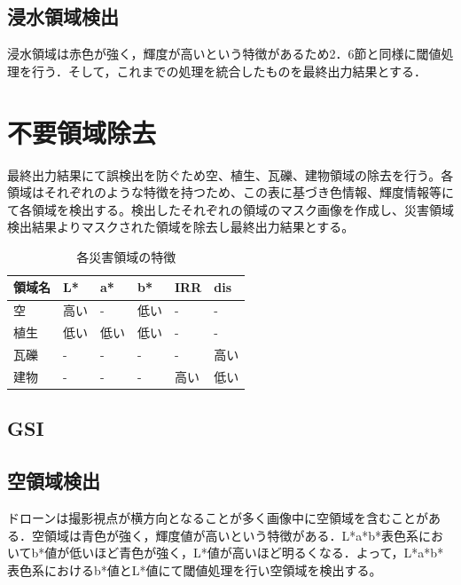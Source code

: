 \documentclass[../Thesis]{subfiles}
\begin{document}
\subsection{浸水領域検出}
	浸水領域は赤色が強く，輝度が高いという特徴があるため2．6節と同様に閾値処理を行う．そして，これまでの処理を統合したものを最終出力結果とする．


\section{不要領域除去}
  最終出力結果にて誤検出を防ぐため空、植生、瓦礫、建物領域の除去を行う。各領域はそれぞれのような特徴を持つため、この表に基づき色情報、輝度情報等にて各領域を検出する。検出したそれぞれの領域のマスク画像を作成し、災害領域検出結果よりマスクされた領域を除去し最終出力結果とする。

\begin{table}[h]
  \centering
  \caption{各災害領域の特徴}
  \label{tab01}
  \begin{tabular}{l l l l l l}
    領域名 & L* & a* & b* & IRR & dis \\
    \hline
    \hline
    空 & 高い & - & 低い & - & - \\
    植生 & 低い & 低い & 低い & - & - \\
    瓦礫 & - & - & - & - & 高い \\
    建物 & - & - & - & 高い & 低い \\
  \end{tabular}
\end{table}

\subsection{GSI}

\subsection{空領域検出}
  ドローンは撮影視点が横方向となることが多く画像中に空領域を含むことがある．空領域は青色が強く，輝度値が高いという特徴がある．L*a*b*表色系においてb*値が低いほど青色が強く，L*値が高いほど明るくなる．よって，L*a*b*表色系におけるb*値とL*値にて閾値処理を行い空領域を検出する。
\end{document}
